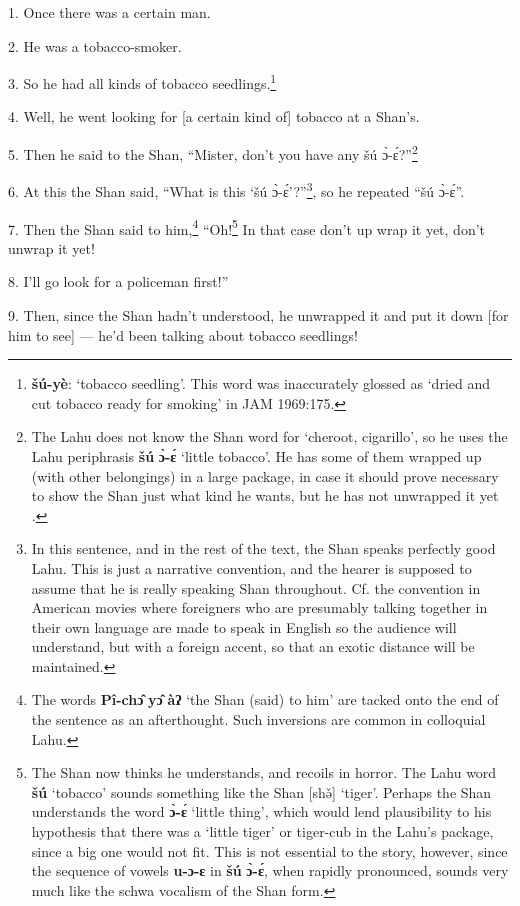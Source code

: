 \setcounter{footnote}{0}

1. Once there was a certain man.

2. He was a tobacco-smoker.

3. So he had all kinds of tobacco seedlings.\footnote{\textbf{šú-yè}: `tobacco seedling'. This word was inaccurately glossed as `dried and cut tobacco ready for smoking' in JAM 1969:175.}

4. Well, he went looking for [a certain kind of] tobacco at a Shan's.

5. Then he said to the Shan, ``Mister, don't you have any šú ɔ̀-ɛ́?''\footnote{The Lahu does not know the Shan word for `cheroot, cigarillo', so he uses the Lahu periphrasis \textbf{šú} \textbf{ɔ̀-ɛ́} `little tobacco'. He has some of them wrapped up (with other belongings) in a large package, in case it should prove necessary to show the Shan just what kind he wants, but he has not unwrapped it yet .}

6. At this the Shan said, ``What is this `šú ɔ̀-ɛ́'?''\footnote{In this sentence, and in the rest of the text, the Shan speaks perfectly good Lahu. This is just a narrative convention, and the hearer is supposed to assume that he is really speaking Shan throughout. Cf. the convention in American movies where foreigners who are presumably talking together in their own language are made to speak in English so the audience will understand, but with a foreign accent, so that an exotic distance will be maintained.}, so he repeated
``šú ɔ̀-ɛ́''.

7. Then the Shan said to him,\footnote{The words \textbf{Pî-chɔ̂} \textbf{yɔ̂} \textbf{àʔ} `the Shan (said) to him' are tacked onto the end of the sentence as an afterthought. Such inversions are common in colloquial Lahu.} ``Oh!\footnote{The Shan now thinks he understands, and recoils in horror. The Lahu word \textbf{šú} `tobacco' sounds something like the Shan [shə̌] `tiger'. Perhaps the Shan understands the word \textbf{ɔ̀-ɛ́} `little thing', which would lend plausibility to his hypothesis that there was a `little tiger' or tiger-cub in the Lahu's package, since a big one would not fit. This is not essential to the story, however, since the sequence of vowels \textbf{u-ɔ-ɛ} in \textbf{šú} \textbf{ɔ̀-ɛ́}, when rapidly pronounced, sounds very much like the schwa vocalism of the Shan form.} In that case don't up wrap it yet, don't
unwrap it yet!

8. I'll go look for a policeman first!''

9. Then, since the Shan hadn't understood, he unwrapped it and put it down [for
him to see] --- he'd been talking about tobacco seedlings!

